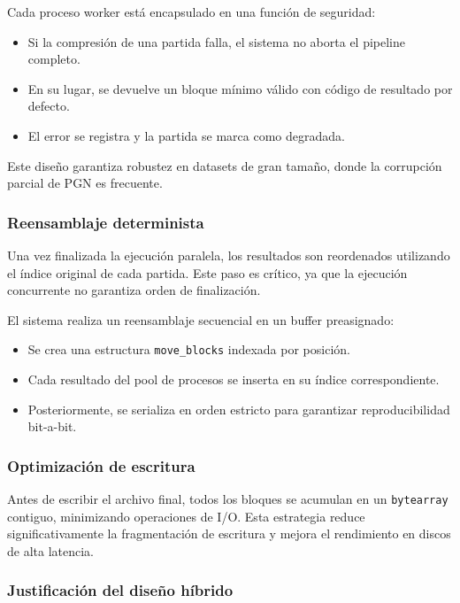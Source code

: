 \documentclass[11pt, letterpaper]{article}
\begin{document}
Cada proceso worker está encapsulado en una función de seguridad:

\begin{itemize}
\item Si la compresión de una partida falla, el sistema no aborta el pipeline completo.
\item En su lugar, se devuelve un bloque mínimo válido con código de resultado por defecto.
\item El error se registra y la partida se marca como degradada.
\end{itemize}

Este diseño garantiza robustez en datasets de gran tamaño, donde la corrupción parcial de PGN es frecuente.

\subsubsection{Reensamblaje determinista}

Una vez finalizada la ejecución paralela, los resultados son reordenados utilizando el índice original de cada partida. Este paso es crítico, ya que la ejecución concurrente no garantiza orden de finalización.

El sistema realiza un reensamblaje secuencial en un buffer preasignado:

\begin{itemize}
\item Se crea una estructura \texttt{move\_blocks} indexada por posición.
\item Cada resultado del pool de procesos se inserta en su índice correspondiente.
\item Posteriormente, se serializa en orden estricto para garantizar reproducibilidad bit-a-bit.
\end{itemize}

\subsubsection{Optimización de escritura}

Antes de escribir el archivo final, todos los bloques se acumulan en un \texttt{bytearray} contiguo, minimizando operaciones de I/O. Esta estrategia reduce significativamente la fragmentación de escritura y mejora el rendimiento en discos de alta latencia.

\subsubsection{Justificación del diseño híbrido}
\end{document}
